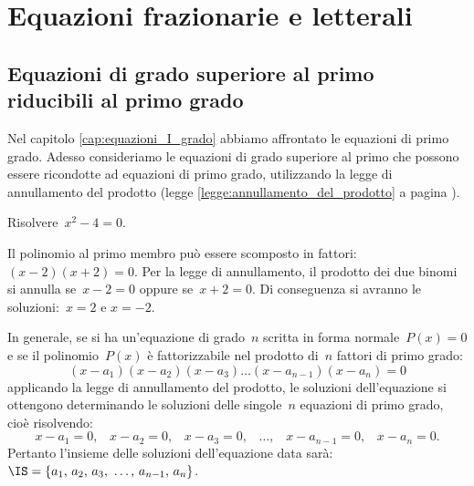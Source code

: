 
\chapter{Equazioni frazionarie e letterali}

\section{Equazioni di grado superiore al primo riducibili al primo grado}
Nel capitolo \ref{cap:equazioni_I_grado} abbiamo affrontato le equazioni di primo grado. Adesso consideriamo le equazioni di grado superiore al primo che possono essere ricondotte ad equazioni di primo grado,
utilizzando la legge di annullamento del prodotto (legge \ref{legge:annullamento_del_prodotto} a pagina \pageref{legge:annullamento_del_prodotto}).

\begin{exrig}
 \begin{esempio}
Risolvere~$x^{2}-4=0$.

Il polinomio al primo membro può essere scomposto in fattori:~$(x-2)(x+2)=0$.
Per la legge di annullamento, il prodotto dei due binomi si annulla se~$x-2=0$ oppure se~$x+2=0$.
Di conseguenza si avranno le soluzioni:~$x=2$ e $x=-2$.
 \end{esempio}
\end{exrig}

In generale, se si ha un'equazione di grado~$n$ scritta in forma normale~$P(x)=0$ e se il polinomio~$P(x)$ è
fattorizzabile nel prodotto di~$n$ fattori di primo grado:
\begin{equation*}
(x-a_{1})(x-a_{2})(x-a_{3})\ldots (x-a_{n-1})(x-a_{n})=0
\end{equation*}
applicando la legge di annullamento del prodotto, le soluzioni dell'equazione si ottengono determinando le soluzioni delle singole~$n$
equazioni di primo grado, cioè risolvendo:
\begin{equation*}
x-a_{1}=0\text{,~~~}x-a_{2}=0\text{,~~~}x-a_{3}=0\text{,~~~}\ldots\text{,~~~}x-a_{n-1}=0\text{,~~~}x-a_{n}=0.
\end{equation*}
Pertanto l'insieme delle soluzioni dell'equazione data sarà:~$\IS=\{a_{1}\text{,~}a_{2}\text{,~}a_{3}\text{,~}\ldots\text{,~}a_{n-1}\text{,~}a_{n}\}$.

